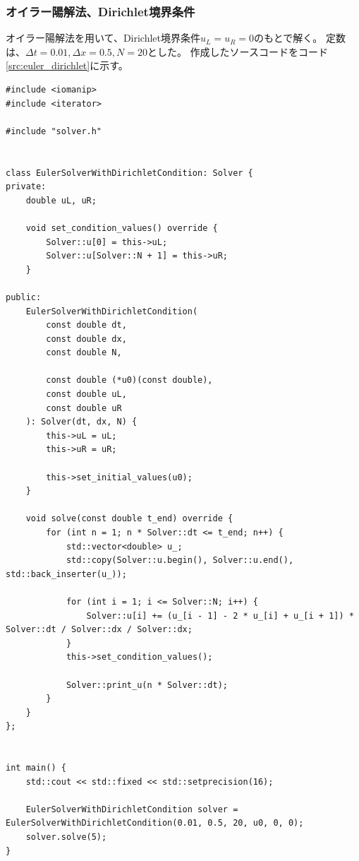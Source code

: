 \documentclass[a4j, titlepage]{jsarticle}
\numberwithin{equation}{section}
\begin{document}
        \subsubsection{オイラー陽解法、Dirichlet境界条件}
            オイラー陽解法を用いて、Dirichlet境界条件$u_L = u_R = 0$のもとで解く。
            定数は、$\Delta t = 0.01, \Delta x = 0.5, N = 20$とした。
            作成したソースコードをコード\ref{src:euler_dirichlet}に示す。
            \begin{lstlisting}[caption=オイラー陽解法を用いてDirichlet境界条件のもとで解くソースコード, label=src:euler_dirichlet]
#include <iomanip>
#include <iterator>

#include "solver.h"


class EulerSolverWithDirichletCondition: Solver {
private:
    double uL, uR;

    void set_condition_values() override {
        Solver::u[0] = this->uL;
        Solver::u[Solver::N + 1] = this->uR;
    }

public:
    EulerSolverWithDirichletCondition(
        const double dt,
        const double dx,
        const double N,

        const double (*u0)(const double),
        const double uL,
        const double uR
    ): Solver(dt, dx, N) {
        this->uL = uL;
        this->uR = uR;

        this->set_initial_values(u0);
    }

    void solve(const double t_end) override {
        for (int n = 1; n * Solver::dt <= t_end; n++) {
            std::vector<double> u_;
            std::copy(Solver::u.begin(), Solver::u.end(), std::back_inserter(u_));

            for (int i = 1; i <= Solver::N; i++) {
                Solver::u[i] += (u_[i - 1] - 2 * u_[i] + u_[i + 1]) * Solver::dt / Solver::dx / Solver::dx;
            }
            this->set_condition_values();
            
            Solver::print_u(n * Solver::dt);
        }
    }
};


int main() {
    std::cout << std::fixed << std::setprecision(16);

    EulerSolverWithDirichletCondition solver = EulerSolverWithDirichletCondition(0.01, 0.5, 20, u0, 0, 0);
    solver.solve(5);
}\end{lstlisting}
\end{document}
